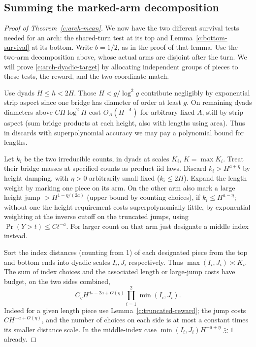 \subsection{Summing the marked-arm decomposition}
\begin{proof}[Proof of Theorem~\ref{c:arch-mean}]
We now have the two different survival tests needed for an arch: the
shared-turn test at its top and Lemma~\ref{c:bottom-survival} at its bottom.
Write $b=1/2$, as in the proof of that lemma.
Use the two-arm decomposition above, whose actual arms are disjoint after
the turn. We will prove \eqref{c:arch-dyadic-target} by allocating independent
groups of pieces to these tests, the reward, and the two-coordinate match.

Use dyads \(H\le h<2H\). Those \(H<g/\log^2 g\) contribute negligibly by exponential strip aspect since one bridge has diameter of order at least \(g\). On remaining dyads diameters above \(C H\log^2 H\) cost \(O_A(H^{-A})\) for arbitrary fixed \(A\), still by strip aspect (sum bridge products at each height, also with lengths using area). Thus in discards with superpolynomial accuracy we may pay a polynomial bound for lengths.

Let \(k_i\) be the two irreducible counts, in dyads at scales \(K_i\), \(K=\max K_i\). Treat their bridge masses at specified counts as product iid laws. Discard \(k_i>H^{a+\eta}\) by height damping, with \(\eta>0\) arbitrarily small fixed (\(k_i\le2H\)). Expand the length weight by marking one piece on its arm. On the other arm also mark a large height jump \(>H^{1-\eta/(2a)}\) (upper bound by counting choices), if \(k_i\le H^{a-\eta}\); without one the height requirement costs superpolynomially little, by exponential weighting at the inverse cutoff on the truncated jumps, using \(\Pr(Y>t)\le C t^{-a}\). For larger count on that arm just designate a middle index instead.

Sort the index distances (counting from 1) of each designated piece from the top and bottom ends into dyadic scales \(I_i,J_i\) respectively. Thus \(\max(I_i,J_i)\asymp K_i\). The sum of index choices and the associated length or large-jump costs have budget, on the two sides combined,
\[
 C_\eta H^{d_*-2a+O(\eta)}
       \prod_{i=1}^2\min(I_i,J_i).
\]
Indeed for a given length piece use Lemma~\ref{c:truncated-reward}; the jump costs \(C H^{-a+O(\eta)}\), and the number of choices on each side is at most a constant times its smaller distance scale. In the middle-index case \(\min(I_i,J_i)H^{-a+\eta}\gtrsim1\) already.


\end{proof}
